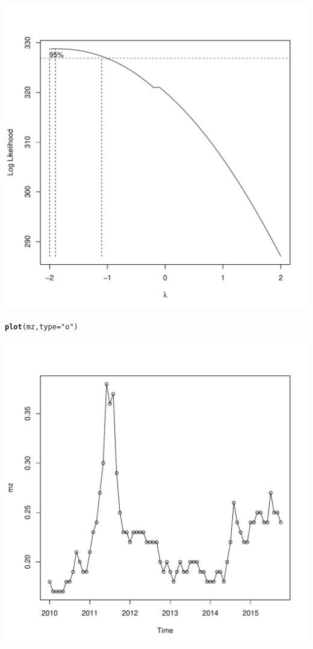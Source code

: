 \documentclass{article}\usepackage[]{graphicx}\usepackage[]{color}
\makeatletter
\def\maxwidth{ %
  \ifdim\Gin@nat@width>\linewidth
    \linewidth
  \else
    \Gin@nat@width
  \fi
}
\newcommand{\hlstr}[1]{\textcolor[rgb]{0.192,0.494,0.8}{#1}}%
\newcommand{\hlstd}[1]{\textcolor[rgb]{0.345,0.345,0.345}{#1}}%
\newcommand{\hlkwc}[1]{\textcolor[rgb]{0.333,0.667,0.333}{#1}}%
\newcommand{\hlkwd}[1]{\textcolor[rgb]{0.737,0.353,0.396}{\textbf{#1}}}%
\newenvironment{kframe}{%
 \def\at@end@of@kframe{}%
 \ifinner\ifhmode%
  \def\at@end@of@kframe{\end{minipage}}%
  \begin{minipage}{\columnwidth}%
 \fi\fi%
 \def\FrameCommand##1{\hskip\@totalleftmargin \hskip-\fboxsep
 \colorbox{shadecolor}{##1}\hskip-\fboxsep
     \hskip-\linewidth \hskip-\@totalleftmargin \hskip\columnwidth}%
 \MakeFramed {\advance\hsize-\width
   \@totalleftmargin\z@ \linewidth\hsize
   \@setminipage}}%
 {\par\unskip\endMakeFramed%
 \at@end@of@kframe}
\newenvironment{knitrout}{}{} %
\makeatother
\begin{document}
\begin{knitrout}
\begin{kframe}
{\ttfamily\noindent\color{warningcolor}{\#\# Warning in arima0(x, order = c(i, 0L, 0L), include.mean = demean): possible convergence problem: optim gave code = 1}}\end{kframe}
\includegraphics[width=\maxwidth]{figure/unnamed-chunk-2-1} 
\begin{kframe}\begin{alltt}
\hlkwd{plot}\hlstd{(mz,}\hlkwc{type}\hlstd{=}\hlstr{"o"}\hlstd{)}
\end{alltt}
\end{kframe}
\includegraphics[width=\maxwidth]{figure/unnamed-chunk-2-2} 

\end{knitrout}
\end{document}
